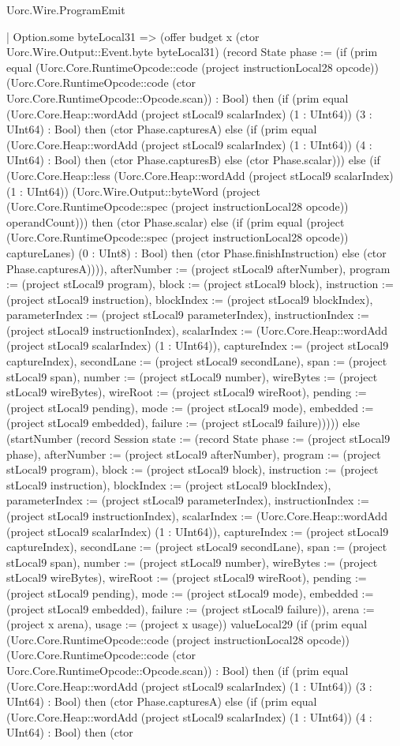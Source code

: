 \begin{lexlean}{Uorc.Wire.ProgramEmit}
\begin{semanticmodule}
{            | Option.some byteLocal31 => (offer budget x (ctor Uorc.Wire.Output::Event.byte byteLocal31) (record State {phase := (if (prim equal (Uorc.Core.RuntimeOpcode::code (project instructionLocal28 opcode)) (Uorc.Core.RuntimeOpcode::code (ctor Uorc.Core.RuntimeOpcode::Opcode.scan)) : Bool) then (if (prim equal (Uorc.Core.Heap::wordAdd (project stLocal9 scalarIndex) (1 : UInt64)) (3 : UInt64) : Bool) then (ctor Phase.capturesA) else (if (prim equal (Uorc.Core.Heap::wordAdd (project stLocal9 scalarIndex) (1 : UInt64)) (4 : UInt64) : Bool) then (ctor Phase.capturesB) else (ctor Phase.scalar))) else (if (Uorc.Core.Heap::less (Uorc.Core.Heap::wordAdd (project stLocal9 scalarIndex) (1 : UInt64)) (Uorc.Wire.Output::byteWord (project (Uorc.Core.RuntimeOpcode::spec (project instructionLocal28 opcode)) operandCount))) then (ctor Phase.scalar) else (if (prim equal (project (Uorc.Core.RuntimeOpcode::spec (project instructionLocal28 opcode)) captureLanes) (0 : UInt8) : Bool) then (ctor Phase.finishInstruction) else (ctor Phase.capturesA)))), afterNumber := (project stLocal9 afterNumber), program := (project stLocal9 program), block := (project stLocal9 block), instruction := (project stLocal9 instruction), blockIndex := (project stLocal9 blockIndex), parameterIndex := (project stLocal9 parameterIndex), instructionIndex := (project stLocal9 instructionIndex), scalarIndex := (Uorc.Core.Heap::wordAdd (project stLocal9 scalarIndex) (1 : UInt64)), captureIndex := (project stLocal9 captureIndex), secondLane := (project stLocal9 secondLane), span := (project stLocal9 span), number := (project stLocal9 number), wireBytes := (project stLocal9 wireBytes), wireRoot := (project stLocal9 wireRoot), pending := (project stLocal9 pending), mode := (project stLocal9 mode), embedded := (project stLocal9 embedded), failure := (project stLocal9 failure)})))) else (startNumber (record Session {state := (record State {phase := (project stLocal9 phase), afterNumber := (project stLocal9 afterNumber), program := (project stLocal9 program), block := (project stLocal9 block), instruction := (project stLocal9 instruction), blockIndex := (project stLocal9 blockIndex), parameterIndex := (project stLocal9 parameterIndex), instructionIndex := (project stLocal9 instructionIndex), scalarIndex := (Uorc.Core.Heap::wordAdd (project stLocal9 scalarIndex) (1 : UInt64)), captureIndex := (project stLocal9 captureIndex), secondLane := (project stLocal9 secondLane), span := (project stLocal9 span), number := (project stLocal9 number), wireBytes := (project stLocal9 wireBytes), wireRoot := (project stLocal9 wireRoot), pending := (project stLocal9 pending), mode := (project stLocal9 mode), embedded := (project stLocal9 embedded), failure := (project stLocal9 failure)}), arena := (project x arena), usage := (project x usage)}) valueLocal29 (if (prim equal (Uorc.Core.RuntimeOpcode::code (project instructionLocal28 opcode)) (Uorc.Core.RuntimeOpcode::code (ctor Uorc.Core.RuntimeOpcode::Opcode.scan)) : Bool) then (if (prim equal (Uorc.Core.Heap::wordAdd (project stLocal9 scalarIndex) (1 : UInt64)) (3 : UInt64) : Bool) then (ctor Phase.capturesA) else (if (prim equal (Uorc.Core.Heap::wordAdd (project stLocal9 scalarIndex) (1 : UInt64)) (4 : UInt64) : Bool) then (ctor }
\end{semanticmodule}
\end{lexlean}
